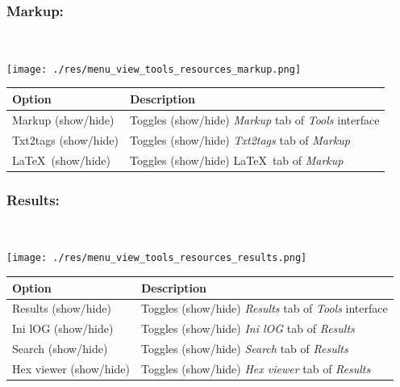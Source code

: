 \hypertarget{menu_view_tools_resources_markup}{}
\subsubsection{Markup:}\\

\texttt{[image: ./res/menu\_view\_tools\_resources\_markup.png]}\\

\begin{scriptsize}
  \begin{tabularx}{\textwidth}{>{\hsize=0.3\hsize}X>{\hsize=0.7\hsize}X}\\
    \hline
    \textbf{Option} & \textbf{Description} \\
    \hline
    Markup (show/hide) & Toggles (show/hide) \textit{Markup} tab of \textit{Tools} interface \\
    \hdashline[1pt/1pt]
    Txt2tags (show/hide) & Toggles (show/hide) \textit{Txt2tags} tab of \textit{Markup} \\
    \LaTeX ~(show/hide) & Toggles (show/hide) \LaTeX ~tab of \textit{Markup} \\
    \hline
  \end{tabularx}
\end{scriptsize}


\hypertarget{menu_view_tools_resources_results}{}
\subsubsection{Results:}\\

\texttt{[image: ./res/menu\_view\_tools\_resources\_results.png]}\\

\begin{scriptsize}
  \begin{tabularx}{\textwidth}{>{\hsize=0.3\hsize}X>{\hsize=0.7\hsize}X}\\
    \hline
    \textbf{Option} & \textbf{Description} \\
    \hline
    Results (show/hide) & Toggles (show/hide) \textit{Results} tab of \textit{Tools} interface \\
    \hdashline[1pt/1pt]
    Ini lOG (show/hide) & Toggles (show/hide) \textit{Ini lOG} tab of \textit{Results} \\
    Search (show/hide) & Toggles (show/hide) \textit{Search} tab of \textit{Results} \\
    Hex viewer (show/hide) & Toggles (show/hide) \textit{Hex viewer} tab of \textit{Results} \\
    \hline
  \end{tabularx}
\end{scriptsize}


